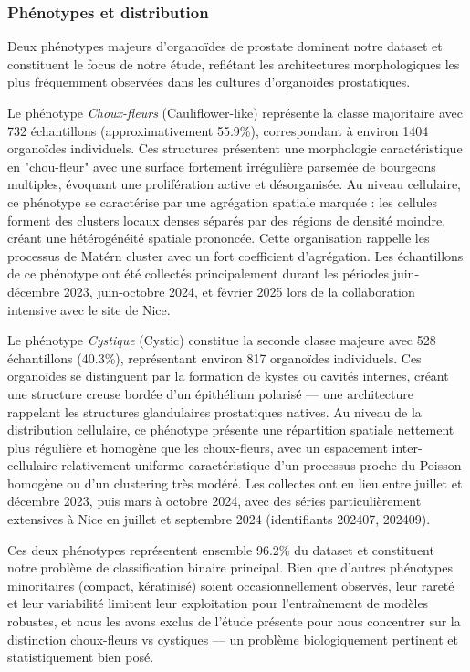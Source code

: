 \subsubsection{Phénotypes et distribution}

Deux phénotypes majeurs d'organoïdes de prostate dominent notre dataset et constituent le focus de notre étude, reflétant les architectures morphologiques les plus fréquemment observées dans les cultures d'organoïdes prostatiques.

Le phénotype \textit{Choux-fleurs} (Cauliflower-like) représente la classe majoritaire avec 732 échantillons (approximativement 55.9\%), correspondant à environ 1404 organoïdes individuels. Ces structures présentent une morphologie caractéristique en "chou-fleur" avec une surface fortement irrégulière parsemée de bourgeons multiples, évoquant une prolifération active et désorganisée. Au niveau cellulaire, ce phénotype se caractérise par une agrégation spatiale marquée : les cellules forment des clusters locaux denses séparés par des régions de densité moindre, créant une hétérogénéité spatiale prononcée. Cette organisation rappelle les processus de Matérn cluster avec un fort coefficient d'agrégation. Les échantillons de ce phénotype ont été collectés principalement durant les périodes juin-décembre 2023, juin-octobre 2024, et février 2025 lors de la collaboration intensive avec le site de Nice.

Le phénotype \textit{Cystique} (Cystic) constitue la seconde classe majeure avec 528 échantillons (40.3\%), représentant environ 817 organoïdes individuels. Ces organoïdes se distinguent par la formation de kystes ou cavités internes, créant une structure creuse bordée d'un épithélium polarisé — une architecture rappelant les structures glandulaires prostatiques natives. Au niveau de la distribution cellulaire, ce phénotype présente une répartition spatiale nettement plus régulière et homogène que les choux-fleurs, avec un espacement inter-cellulaire relativement uniforme caractéristique d'un processus proche du Poisson homogène ou d'un clustering très modéré. Les collectes ont eu lieu entre juillet et décembre 2023, puis mars à octobre 2024, avec des séries particulièrement extensives à Nice en juillet et septembre 2024 (identifiants 202407, 202409).

Ces deux phénotypes représentent ensemble 96.2\% du dataset et constituent notre problème de classification binaire principal. Bien que d'autres phénotypes minoritaires (compact, kératinisé) soient occasionnellement observés, leur rareté et leur variabilité limitent leur exploitation pour l'entraînement de modèles robustes, et nous les avons exclus de l'étude présente pour nous concentrer sur la distinction choux-fleurs vs cystiques — un problème biologiquement pertinent et statistiquement bien posé.

